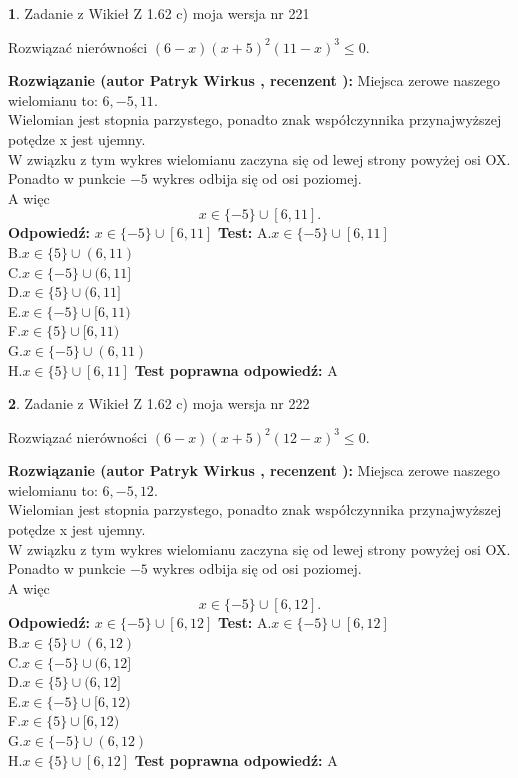 \documentclass[12pt, a4paper]{article}
\theoremstyle{definition} %
\newtheorem{zad}{}
\newcommand{\zadStart}[1]{\begin{zad}#1\newline}
\newcommand{\zadStop}{\end{zad}}
\newcommand{\rozwStart}[2]{\noindent \textbf{Rozwiązanie (autor #1 , recenzent #2): }\newline}
\newcommand{\rozwStop}{\newline}
\newcommand{\odpStart}{\noindent \textbf{Odpowiedź:}\newline}
\newcommand{\odpStop}{\newline}
\newcommand{\testStart}{\noindent \textbf{Test:}\newline}
\newcommand{\testStop}{\newline}
\newcommand{\kluczStart}{\noindent \textbf{Test poprawna odpowiedź:}\newline}
\newcommand{\kluczStop}{\newline}
\begin{document}
\zadStart{Zadanie z Wikieł Z 1.62 c) moja wersja nr 221}

Rozwiązać nierówności $(6-x)(x+5)^{2}(11-x)^{3}\le0$.
\zadStop
\rozwStart{Patryk Wirkus}{}
Miejsca zerowe naszego wielomianu to: $6, -5, 11$.\\
Wielomian jest stopnia parzystego, ponadto znak współczynnika przy\linebreak najwyższej potędze x jest ujemny.\\ W związku z tym wykres wielomianu zaczyna się od lewej strony powyżej osi OX.\\
Ponadto w punkcie $-5$ wykres odbija się od osi poziomej.\\
A więc $$x \in \{-5\} \cup [6,11].$$
\rozwStop
\odpStart
$x \in \{-5\} \cup [6,11]$
\odpStop
\testStart
A.$x \in \{-5\} \cup [6,11]$\\
B.$x \in \{5\} \cup (6,11)$\\
C.$x \in \{-5\} \cup (6,11]$\\
D.$x \in \{5\} \cup (6,11]$\\
E.$x \in \{-5\} \cup [6,11)$\\
F.$x \in \{5\} \cup [6,11)$\\
G.$x \in \{-5\} \cup (6,11)$\\
H.$x \in \{5\} \cup [6,11]$
\testStop
\kluczStart
A
\kluczStop



\zadStart{Zadanie z Wikieł Z 1.62 c) moja wersja nr 222}

Rozwiązać nierówności $(6-x)(x+5)^{2}(12-x)^{3}\le0$.
\zadStop
\rozwStart{Patryk Wirkus}{}
Miejsca zerowe naszego wielomianu to: $6, -5, 12$.\\
Wielomian jest stopnia parzystego, ponadto znak współczynnika przy\linebreak najwyższej potędze x jest ujemny.\\ W związku z tym wykres wielomianu zaczyna się od lewej strony powyżej osi OX.\\
Ponadto w punkcie $-5$ wykres odbija się od osi poziomej.\\
A więc $$x \in \{-5\} \cup [6,12].$$
\rozwStop
\odpStart
$x \in \{-5\} \cup [6,12]$
\odpStop
\testStart
A.$x \in \{-5\} \cup [6,12]$\\
B.$x \in \{5\} \cup (6,12)$\\
C.$x \in \{-5\} \cup (6,12]$\\
D.$x \in \{5\} \cup (6,12]$\\
E.$x \in \{-5\} \cup [6,12)$\\
F.$x \in \{5\} \cup [6,12)$\\
G.$x \in \{-5\} \cup (6,12)$\\
H.$x \in \{5\} \cup [6,12]$
\testStop
\kluczStart
A
\kluczStop
\end{document}
